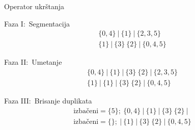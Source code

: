 \documentclass[aspectratio=169,xcolor=dvipsnames]{beamer}
\begin{document}

\begin{frame}{Operator ukrštanja}
    \begin{exampleblock}{Faza I:\ Segmentacija}
        \[
            \begin{aligned}
                \{0, 4\}\ |\ \{1\}\ |\ \{2, 3, 5\} \\
                \{1\}\ |\ \{3\}\ \{2\}\ |\ \{0, 4, 5\}
            \end{aligned}
        \]
    \end{exampleblock}
    \begin{exampleblock}{Faza II:\ Umetanje}
        \[
            \begin{aligned}
                \{0, 4\}\ |\ \{1\}\ |\ \{3\}\ \{2\}\ |\ \{2, 3, 5\} \\
                \{1\}\ |\ \{1\}\ |\ \{3\}\ \{2\}\ |\ \{0, 4, 5\}
            \end{aligned}
        \]
    \end{exampleblock}
    \begin{exampleblock}{Faza III:\ Brisanje duplikata}
        \[
            \begin{aligned}
                \text{izbačeni}= \{ 5\};\ \{0, 4\}\ |\ \{1\}\ |\ \{3\}\ \{2\}\ |\  \\
                \text{izbačeni}= \{\};\ |\ \{1\}\ |\ \{3\}\ \{2\}\ |\ \{0, 4, 5\}  
            \end{aligned}
        \]
    \end{exampleblock}
\end{frame}

\end{document}
